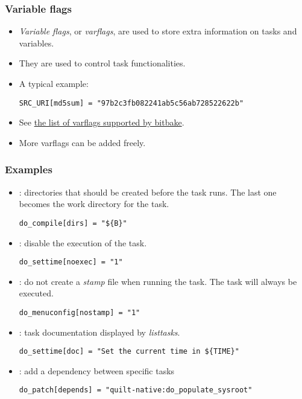 \begin{frame}[fragile]
  \frametitle{Variable flags}
  \begin{itemize}
    \item {\em Variable flags}, or {\em varflags}, are used to store extra
      information on tasks and variables.
    \item They are used to control task functionalities.
    \item A typical example:
  \begin{verbatim}
SRC_URI[md5sum] = "97b2c3fb082241ab5c56ab728522622b"
  \end{verbatim}
  \item See
    \href{https://docs.yoctoproject.org/bitbake/2.2/bitbake-user-manual/bitbake-user-manual-metadata.html#variable-flags}{the list of varflags supported by bitbake}.
  \item More varflags can be added freely.
  \end{itemize}
\end{frame}

\begin{frame}[fragile]
  \frametitle{Examples}
  \begin{itemize}
    \item {}: directories that should be created before the task
      runs. The last one becomes the work directory for the task.
      \begin{verbatim}
do_compile[dirs] = "${B}"
      \end{verbatim}
    \item {}: disable the execution of the task.
      \begin{verbatim}
do_settime[noexec] = "1"
      \end{verbatim}
    \item {}: do not create a {\em stamp} file when running the
      task. The task will always be executed.
      \begin{verbatim}
do_menuconfig[nostamp] = "1"
      \end{verbatim}
    \item {}: task documentation displayed by {\em listtasks}.
      \begin{verbatim}
do_settime[doc] = "Set the current time in ${TIME}"
      \end{verbatim}
    \item {}: add a dependency between specific tasks
      \begin{verbatim}
do_patch[depends] = "quilt-native:do_populate_sysroot"
      \end{verbatim}
  \end{itemize}
\end{frame}

